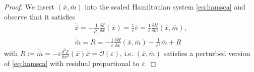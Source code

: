 \documentclass[10pt, letterpaper]{article}
\def\E{{\mathcal{E}}}
\def\bx{\bar{x}}
\def\eps{\varepsilon}
\theoremstyle{definition}
\theoremstyle{remark}
\begin{document}
\begin{proof}

We insert $(\bar x, \bar m)$ into the scaled Hamiltonian system \eqref{eq:hamsca} and observe that it satisfies
\begin{equation}\label{eq:hamscap}
 \begin{split}
  \dot{\bar x} =-\frac{1}{\rho_0}\frac{\delta \E}{\delta x}(\bar x) = \frac{1}{\eps}\bar v=  \frac{1}{\eps} \frac{\delta H}{\delta m}(\bx,\bar m), \\
  {\dot{ \bar m}} =  R =  -\frac{1}{\eps}\frac{\delta H}{\delta x}(\bar x,\bar m) - \frac{1}{\eps^2} \bar m + R
 \end{split}
\end{equation}
with $R:= \dot{ \bar m}= -\eps \frac{\delta^2 \mathcal{E}}{\delta x^2}(\bar{x}) \dot{\bar{x}}=\mathcal{O}(\eps)$, i.e. $(\bar x, \bar m)$ satisfies a perturbed version of \eqref{eq:hamsca} with residual proportional to $\eps.$



\end{proof}
\end{document}
